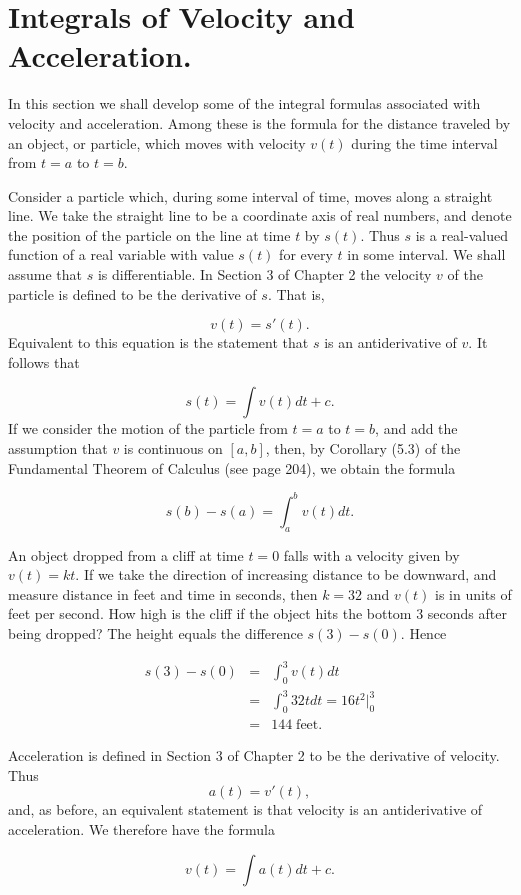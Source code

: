 \section{Integrals of Velocity and Acceleration.} \label{sec 4.8} 
In this section we shall develop some of the integral formulas associated with velocity and acceleration. Among these is the formula for the distance traveled by an object, or particle, which moves with velocity $v(t)$  during the time interval from $t = a$ to $t = b$.

Consider a particle which, during some interval of time, moves along a straight line. We take the straight line to be a coordinate axis of real numbers, and denote the position of the particle on the line at time $t$ by $s(t)$. Thus $s$ is a real-valued function of a real variable with value $s(t)$ for every $t$ in some interval. We shall assume that $s$ is differentiable. In Section 3 of Chapter 2
the velocity $v$ of the particle is defined to be the derivative of $s$. That is,

$$
v(t)= s'(t).
$$
\noindent Equivalent to this equation is the statement that $s$ is an antiderivative of $v$. It follows that

\begin{equation}
s(t) = \int v(t) dt + c.  
\label{eq4.8.1}
\end{equation}
\noindent If we consider the motion of the particle from $t = a$ to $t = b$, and add the assumption that $v$ is continuous on $[a, b]$, then, by Corollary (5.3) of the Fundamental Theorem of Calculus (see page 204), we obtain the formula

\begin{equation}
s(b) - s(a) = \int_{a}^{b} v(t) dt.
\label{eq4.8.2}
\end{equation}

\begin{example}
An object dropped from a cliff at time $t = 0$ falls with a velocity given by $v(t) = kt$. If we take the direction of increasing distance to be downward, and measure distance in feet and time in seconds, then $k = 32$ and $v(t)$ is in units of feet per second. How high is the cliff if the object hits the bottom 3 seconds after being dropped? The height equals the difference $s(3) - s(0)$. Hence

\begin{eqnarray*}
s(3) - s(0) &=& \int_{0}^{3} v(t)dt  \\
            &=& \int_{0}^{3} 32t dt= 16t^{2} \Big|_{0}^{3}\\
            &=& 144 \;\mbox{feet}.
\end{eqnarray*}

Acceleration is defined in Section 3 of Chapter 2 to be the derivative of velocity. Thus
$$
a(t) = v'(t),
$$
\noindent and, as before, an equivalent statement is that velocity is an antiderivative of acceleration. We therefore have the formula

\begin{equation}
v(t) = \int a(t) dt + c.  
\label{eq4.8.3}
\end{equation}
\end{example}

